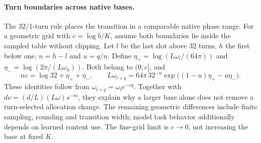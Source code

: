 \paragraph{Turn boundaries across native bases.}
\label{sec:turn-normalization}
The $32/1$-turn rule places the transition in a comparable native phase range.
For a geometric grid with $c=\log b/K$, assume both boundaries lie inside the
sampled table without clipping. Let $l$ be the last slot above $32$ turns,
$h$ the first below one, $n=h-l$ and $u=q/n$. Define
$\eta_+=\log(L\omega_l/(64\pi))$ and
$\eta_-=\log(2\pi/(L\omega_h))$. Both belong to $(0,c]$, and
\begin{equation}
nc=\log32+\eta_++\eta_-,\qquad
L\omega_{l+q}=64\pi\,32^{-u}
 \exp\!\big((1-u)\eta_+-u\eta_-\big).
\label{eq:turn-normalization}
\end{equation}
These identities follow from $\omega_{l+q}=\omega_l e^{-cq}$.
Together with $d\nu=(d/L)(L\omega)s^{-m}$, they explain why a larger base
alone does not remove a turn-selected allocation change. The remaining
geometric differences include finite sampling, rounding and transition width;
model task behavior additionally depends on learned content use.
The fine-grid limit is $c\to0$, not increasing the base at fixed $K$.
